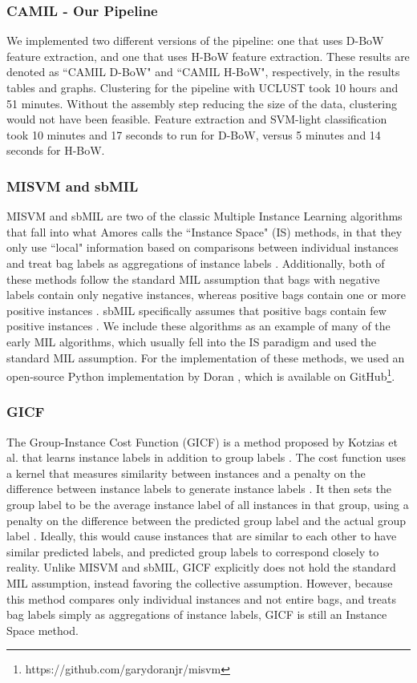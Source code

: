 \subsubsection{CAMIL - Our Pipeline}

We implemented two different versions of the pipeline: one that uses D-BoW feature extraction, and one that uses H-BoW feature extraction. These results are denoted as ``CAMIL D-BoW" and ``CAMIL H-BoW", respectively, in the results tables and graphs. Clustering for the pipeline with UCLUST took 10 hours and 51 minutes. Without the assembly step reducing the size of the data, clustering would not have been feasible. Feature extraction and SVM-light classification took 10 minutes and 17 seconds to run for D-BoW, versus 5 minutes and 14 seconds for H-BoW.

\subsubsection{MISVM and sbMIL}

MISVM \cite{andrews02} and sbMIL \cite{bunescu07} are two of the classic Multiple Instance Learning algorithms that fall into what Amores calls the ``Instance Space" (IS) methods, in that they only use ``local" information based on comparisons between individual instances and treat bag labels as aggregations of instance labels \cite{amores13}. Additionally, both of these methods follow the standard MIL assumption that bags with negative labels contain only negative instances, whereas positive bags contain one or more positive instances \cite{amores13}. sbMIL specifically assumes that positive bags contain few positive instances \cite{bunescu07}. We include these algorithms as an example of many of the early MIL algorithms, which usually fell into the IS paradigm and used the standard MIL assumption. For the implementation of these methods, we used an open-source Python implementation by Doran \cite{doran14}, which is available on GitHub\footnote{https://github.com/garydoranjr/misvm}.

\subsubsection{GICF}

The Group-Instance Cost Function (GICF) is a method proposed by Kotzias et al. that learns instance labels in addition to group labels \cite{kotzias15}. The cost function uses a kernel that measures similarity between instances and a penalty on the difference between instance labels to generate instance labels \cite{kotzias15}. It then sets the group label to be the average instance label of all instances in that group, using a penalty on the difference between the predicted group label and the actual group label \cite{kotzias15}. Ideally, this would cause instances that are similar to each other to have similar predicted labels, and predicted group labels to correspond closely to reality. Unlike MISVM and sbMIL, GICF explicitly does not hold the standard MIL assumption, instead favoring the collective assumption. However, because this method compares only individual instances and not entire bags, and treats bag labels simply as aggregations of instance labels, GICF is still an Instance Space method.

